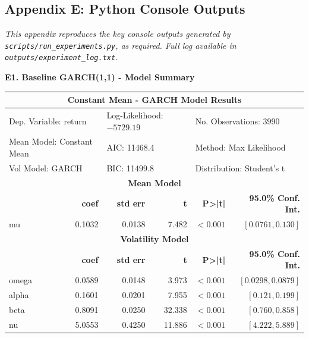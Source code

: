 \documentclass[12pt, a4paper]{article}
\begin{document}

\subsection*{Appendix E: Python Console Outputs}

\textit{This appendix reproduces the key console outputs generated by \texttt{scripts/run\_experiments.py}, as required. Full log available in \texttt{outputs/experiment\_log.txt}.}

\vspace{6pt}
\noindent\textbf{E1. Baseline GARCH(1,1) - Model Summary}

\begin{center}
\footnotesize
\begin{tabular}{lrrrrr}
\toprule
\multicolumn{6}{c}{\textbf{Constant Mean - GARCH Model Results}} \\
\midrule
\multicolumn{2}{l}{Dep. Variable: return} & \multicolumn{2}{l}{Log-Likelihood: $-5729.19$} & \multicolumn{2}{l}{No. Observations: 3990} \\
\multicolumn{2}{l}{Mean Model: Constant Mean} & \multicolumn{2}{l}{AIC: 11468.4} & \multicolumn{2}{l}{Method: Max Likelihood} \\
\multicolumn{2}{l}{Vol Model: GARCH} & \multicolumn{2}{l}{BIC: 11499.8} & \multicolumn{2}{l}{Distribution: Student's t} \\
\midrule
\multicolumn{6}{c}{\textbf{Mean Model}} \\
\midrule
 & \textbf{coef} & \textbf{std err} & \textbf{t} & \textbf{P>|t|} & \textbf{95.0\% Conf. Int.} \\
\midrule
mu & 0.1032 & 0.0138 & 7.482 & $<0.001$ & $[0.0761, 0.130]$ \\
\midrule
\multicolumn{6}{c}{\textbf{Volatility Model}} \\
\midrule
 & \textbf{coef} & \textbf{std err} & \textbf{t} & \textbf{P>|t|} & \textbf{95.0\% Conf. Int.} \\
\midrule
omega & 0.0589 & 0.0148 & 3.973 & $<0.001$ & $[0.0298, 0.0879]$ \\
alpha & 0.1601 & 0.0201 & 7.955 & $<0.001$ & $[0.121, 0.199]$ \\
beta & 0.8091 & 0.0250 & 32.338 & $<0.001$ & $[0.760, 0.858]$ \\
nu & 5.0553 & 0.4250 & 11.886 & $<0.001$ & $[4.222, 5.889]$ \\
\bottomrule
\end{tabular}
\end{center}
\end{document}
